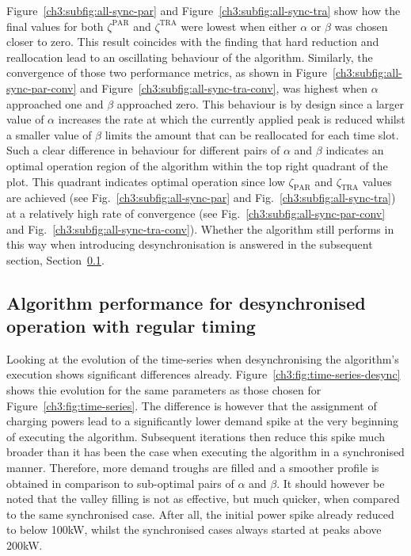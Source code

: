 Figure~\ref{ch3:subfig:all-sync-par} and Figure~\ref{ch3:subfig:all-sync-tra} show how the final values for both $\zeta^\text{PAR}$ and $\zeta^\text{TRA}$ were lowest when either $\alpha$ or $\beta$ was chosen closer to zero.
This result coincides with the finding that hard reduction and reallocation lead to an oscillating behaviour of the algorithm.
Similarly, the convergence of those two performance metrics, as shown in Figure~\ref{ch3:subfig:all-sync-par-conv} and Figure~\ref{ch3:subfig:all-sync-tra-conv}, was highest when $\alpha$ approached one and $\beta$ approached zero.
This behaviour is by design since a larger value of $\alpha$ increases the rate at which the currently applied peak is reduced whilst a smaller value of $\beta$ limits the amount that can be reallocated for each time slot.
Such a clear difference in behaviour for different pairs of $\alpha$ and $\beta$ indicates an optimal operation region of the algorithm within the top right quadrant of the plot.
This quadrant indicates optimal operation since low $\zeta_\text{PAR}$ and $\zeta_\text{TRA}$ values are achieved (see Fig.~\ref{ch3:subfig:all-sync-par} and Fig.~\ref{ch3:subfig:all-sync-tra}) at a relatively high rate of convergence (see Fig.~\ref{ch3:subfig:all-sync-par-conv} and Fig.~\ref{ch3:subfig:all-sync-tra-conv}).
Whether the algorithm still performs in this way when introducing desynchronisation is answered in the subsequent section, Section~\ref{ch3:subsec:algorithm-performance-desynchronised-regular}.


\subsection{Algorithm performance for desynchronised operation with regular timing}
\label{ch3:subsec:algorithm-performance-desynchronised-regular}



Looking at the evolution of the time-series when desynchronising the algorithm's execution shows significant differences already.
Figure~\ref{ch3:fig:time-series-desync} shows thie evolution for the same parameters as those chosen for Figure~\ref{ch3:fig:time-series}.
The difference is however that the assignment of charging powers lead to a significantly lower demand spike at the very beginning of executing the algorithm.
Subsequent iterations then reduce this spike much broader than it has been the case when executing the algorithm in a synchronised manner.
Therefore, more demand troughs are filled and a smoother profile is obtained in comparison to sub-optimal pairs of $\alpha$ and $\beta$.
It should however be noted that the valley filling is not as effective, but much quicker, when compared to the same synchronised case.
After all, the initial power spike already reduced to below 100kW, whilst the synchronised cases always started at peaks above 200kW.

